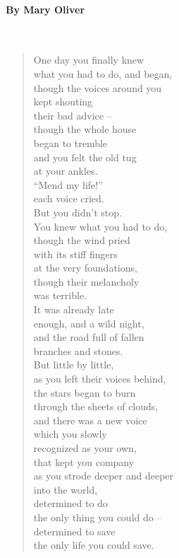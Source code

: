 \paragraph{By Mary Oliver}~
\begin{verse}
	One day you finally knew\\
	what you had to do, and began,\\
	though the voices around you\\
	kept shouting\\
	their bad advice –\\
	though the whole house\\
	began to tremble\\
	and you felt the old tug\\
	at your ankles.\\
	“Mend my life!”\\
	each voice cried.\\
	But you didn’t stop.\\
	You knew what you had to do,\\
	though the wind pried\\
	with its stiff fingers\\
	at the very foundations,\\
	though their melancholy\\
	was terrible.\\
	It was already late\\
	enough, and a wild night,\\
	and the road full of fallen\\
	branches and stones.\\
	But little by little,\\
	as you left their voices behind,\\
	the stars began to burn\\
	through the sheets of clouds,\\
	and there was a new voice\\
	which you slowly\\
	recognized as your own,\\
	that kept you company\\
	as you strode deeper and deeper\\
	into the world,\\
	determined to do\\
	the only thing you could do –\\
	determined to save\\
	the only life you could save.
\end{verse}

